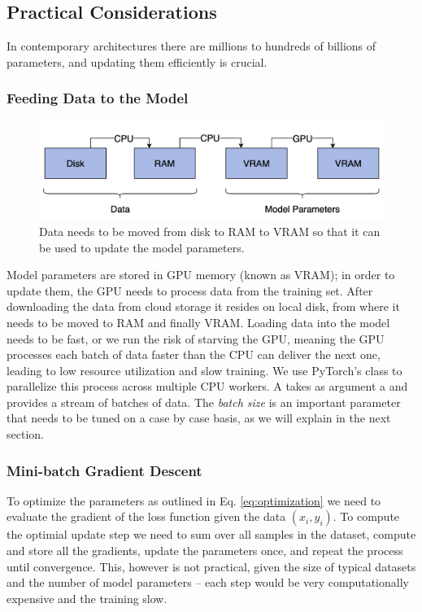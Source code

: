 \subsection{Practical Considerations}
In contemporary architectures there are millions to hundreds of billions of parameters, and updating them efficiently is crucial.

\subsubsection{Feeding Data to the Model}
\begin{figure}[h]
    \includegraphics[width=\linewidth]{chapters/NLP/figures/ram_cpu_vram.png}
    \caption{Data needs to be moved from disk to RAM to VRAM so that it can be used to update the model parameters.}
    \label{fig:ram_cpu_vram}
\end{figure}
Model parameters are stored in GPU memory (known as VRAM); in order to update them, the GPU needs to process data from the training set.
After downloading the data from cloud storage it resides on local disk, from where it needs to be moved to RAM and finally VRAM.
Loading data into the model needs to be fast, or we run the risk of starving the GPU, meaning the GPU processes each batch of data faster than the CPU can deliver the next one, leading to low resource utilization and slow training.
We use PyTorch's  class to parallelize this process across multiple CPU workers.
A  takes as argument a  and provides a stream of batches of data.
The \textit{batch size} is an important parameter that needs to be tuned on a case by case basis, as we will explain in the next section.


\subsubsection{Mini-batch Gradient Descent}
To optimize the parameters as outlined in Eq. \ref{eq:optimization} we need to evaluate the gradient of the loss function given the data $(x_i, y_i)$.
To compute the optimial update step we need to sum over all samples in the dataset, compute and store all the gradients, update the parameters once, and repeat the process until convergence.
This, however is not practical, given the size of typical datasets and the number of model parameters -- each step would be very computationally expensive and the training slow.

